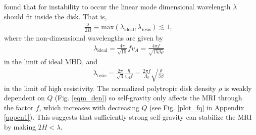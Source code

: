 
\cite{sano99} found that for instability to occur the linear mode
dimensional wavelength $\lambda$ should fit inside the disk. That is,   
\begin{align}\label{sano_crit}
  \frac{\lambda}{2H} \equiv
  \mathrm{max}\left(\lambda_\mathrm{ideal},\lambda_\mathrm{resis}\right)\lesssim
  1, 
\end{align}
where the non-dimensional wavelengths are given by 
\begin{align}\label{lambda_ideal}
  \lambda_\mathrm{ideal} = \frac{4\pi}{\sqrt{15}} f v_A =
  \frac{4\pi f}{\sqrt{15\beta\rho}}
\end{align}
in the limit of ideal MHD, and 
\begin{align}\label{lambda_resis}
  \lambda_\mathrm{resis} = \frac{2\pi}{\sqrt{3}}\frac{\eta}{v_A f} =
  \frac{2\pi f}{\Lambda_0}\sqrt{\frac{\rho}{3\beta}} 
\end{align}
in the limit of high resistivity. 
The normalized polytropic disk density $\rho$ is weakly dependent
on $Q$ (Fig. \ref{eqm_den}) so self-gravity only affects the
MRI through the factor $f$, which increases with decreasing $Q$ (see
Fig. \ref{plot_fq} in Appendix \ref{appen1}). This suggests that
sufficiently strong self-gravity can stabilize the MRI by making
$ 2H<\lambda $. 
 

